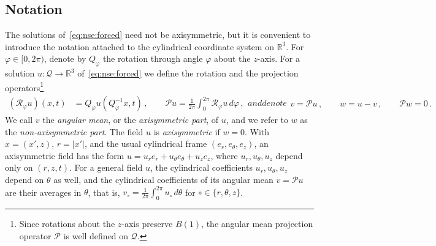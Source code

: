 \documentclass[11pt,reqno]{amsproc}
\numberwithin{equation}{section}
\theoremstyle{remark}
\newcommand{\RR}{\mathbb R}
\begin{document}
\subsection{Notation}
\label{sec:aniso:notation}

The solutions of~\eqref{eq:nse:forced} need not be axisymmetric, but it is convenient to introduce the notation attached to the cylindrical coordinate system on $\RR^3$. For $\varphi\in[0,2\pi)$, denote by $Q_\varphi$ the rotation through angle $\varphi$ about the $z$-axis. For a solution $u\colon\mathcal Q\to\RR^3$ of~\eqref{eq:nse:forced} we define the rotation and the projection operators\footnote{\label{foot:angular:mean}Since rotations about the $z$-axis preserve $B(1)$, the angular mean projection operator $\mathcal P$ is well defined on $\mathcal Q$.}
\begin{subequations}
\label{eq:interior:average}
\begin{align}
(\mathscr R_\varphi u)(x,t)
&=Q_\varphi u(Q_\varphi^{-1}x,t)\,,
\qquad
\mathcal Pu=\frac1{2\pi}\int_0^{2\pi}\mathscr R_\varphi u\,d\varphi\,,
\end{align}
and denote
\begin{align}
v=\mathcal Pu\,,\qquad w=u-v\,,\qquad \mathcal Pw=0
\,.
\end{align}
\end{subequations}
We call $v$ the \emph{angular mean}, or the \emph{axisymmetric part}, of $u$, and we refer to $w$ as the \emph{non-axisymmetric part}. The field $u$ is \emph{axisymmetric} if $w=0$. With $x=(x',z)$, $r=|x'|$, and the usual cylindrical frame $(e_r,e_\theta,e_z)$, an axisymmetric field has the form $u=u_re_r+u_\theta e_\theta+u_ze_z$, where $u_r,u_\theta,u_z$ depend only on $(r,z,t)$. For a general field $u$, the cylindrical coefficients $u_r,u_\theta,u_z$ depend on $\theta$ as well, and the cylindrical coefficients of its angular mean $v=\mathcal Pu$ are their averages in $\theta$, that is, $v_\circ=\frac1{2\pi}\int_0^{2\pi}u_\circ\,d\theta$ for $\circ \in\{r,\theta,z\}$.
\end{document}
